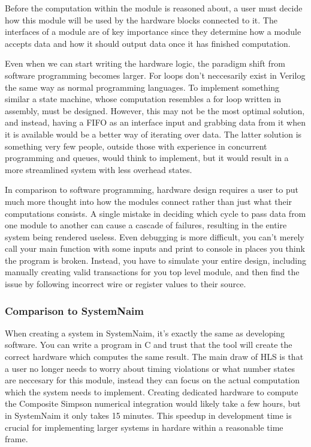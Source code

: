 Before the computation within the module is reasoned about, a user must decide how this module will be used by the hardware blocks connected to it. The interfaces of a module are of key importance since they determine how a module accepts data and how it should output data once it has finished computation.

Even when we can start writing the hardware logic, the paradigm shift from software programming becomes larger. For loops don't neccesarily exist in Verilog the same way as normal programming languages. To implement something similar a state machine, whose computation resembles a for loop written in assembly, must be designed. However, this may not be the most optimal solution, and instead, having a FIFO as an interface input and grabbing data from it when it is available would be a better way of iterating over data. The latter solution is something very few people, outside those with experience in concurrent programming and queues, would think to implement, but it would result in a more streamlined system with less overhead states.

In comparison to software programming, hardware design requires a user to put much more thought into how the modules connect rather than just what their computations consists. A single mistake in deciding which cycle to pass data from one module to another can cause a cascade of failures, resulting in the entire system being rendered useless. Even debugging is more difficult, you can't merely call your main function with some inputs and print to console in places you think the program is broken. Instead, you have to simulate your entire design, including manually creating valid transactions for you top level module, and then find the issue by following incorrect wire or register values to their source.

\subsubsection{Comparison to SystemNaim}

When creating a system in SystemNaim, it's exactly the same as developing software. You can write a program in C and trust that the tool will create the correct hardware which computes the same result. The main draw of HLS is that a user no longer needs to worry about timing violations or what number states are neccesary for this module, instead they can focus on the actual computation which the system needs to implement. Creating dedicated hardware to compute the Composite Simpson numerical integration would likely take a few hours, but in SystemNaim it only takes 15 minutes. This speedup in development time is crucial for implementing larger systems in hardare within a reasonable time frame.

